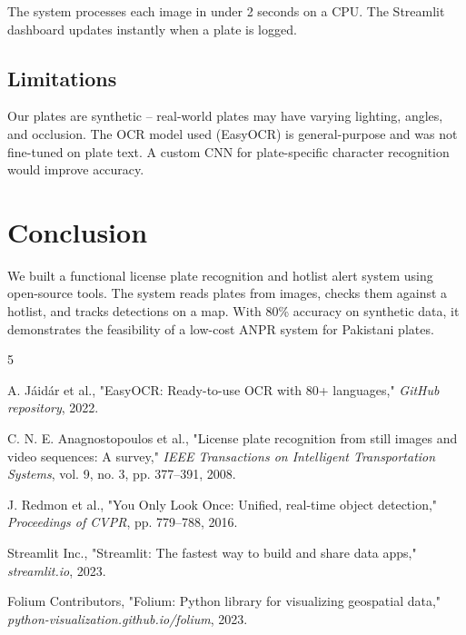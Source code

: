 \documentclass[11pt,a4paper]{article}
\begin{document}
The system processes each image in under 2 seconds on a CPU. The Streamlit dashboard updates instantly when a plate is logged.

\subsection{Limitations}

Our plates are synthetic -- real-world plates may have varying lighting, angles, and occlusion. The OCR model used (EasyOCR) is general-purpose and was not fine-tuned on plate text. A custom CNN for plate-specific character recognition would improve accuracy.

\section{Conclusion}

We built a functional license plate recognition and hotlist alert system using open-source tools. The system reads plates from images, checks them against a hotlist, and tracks detections on a map. With 80\% accuracy on synthetic data, it demonstrates the feasibility of a low-cost ANPR system for Pakistani plates.

\begin{thebibliography}{5}

A. J\'aid\'ar et al., "EasyOCR: Ready-to-use OCR with 80+ languages," \textit{GitHub repository}, 2022.

C. N. E. Anagnostopoulos et al., "License plate recognition from still images and video sequences: A survey," \textit{IEEE Transactions on Intelligent Transportation Systems}, vol. 9, no. 3, pp. 377--391, 2008.

J. Redmon et al., "You Only Look Once: Unified, real-time object detection," \textit{Proceedings of CVPR}, pp. 779--788, 2016.

Streamlit Inc., "Streamlit: The fastest way to build and share data apps," \textit{streamlit.io}, 2023.

Folium Contributors, "Folium: Python library for visualizing geospatial data," \textit{python-visualization.github.io/folium}, 2023.

\end{thebibliography}
\end{document}
